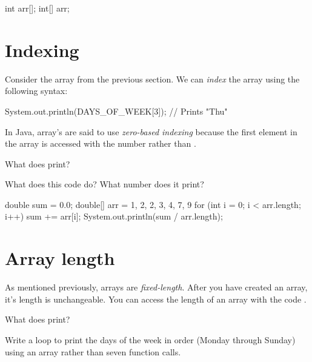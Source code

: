 \begin{code}
int arr[];
int[] arr;
\end{code}

\section{Indexing}

Consider the array  from the previous section. We can \emph{index} the array using the following syntax:

\begin{code}
System.out.println(DAYS_OF_WEEK[3]);  // Prints "Thu"
\end{code}

In Java, array's are said to use \emph{zero-based indexing} because the first element in the array is accessed with the number  rather than .

\begin{example}
What does  print?
\end{example}

\begin{example}
What does this code do? What number does it print?

\begin{code}
double sum = 0.0;
double[] arr = { 1, 2, 2, 3, 4, 7, 9 }
for (int i = 0; i < arr.length; i++) {
    sum += arr[i];
}
System.out.println(sum / arr.length);
\end{code}
\end{example}

\section{Array length}

As mentioned previously, arrays are \emph{fixed-length}. After you have created an array, it's length is unchangeable. You can access the length of an array  with the code .

\begin{example}
What does  print?
\end{example}

\begin{example}
Write a  loop to print the days of the week in order (Monday through Sunday) using an array rather than seven  function calls.
\end{example}

